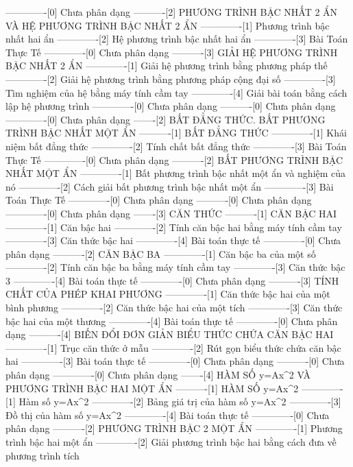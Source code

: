 -------------[0] Chưa phân dạng
----------[2] PHƯƠNG TRÌNH BẬC NHẤT 2 ẨN VÀ HỆ PHƯƠNG TRÌNH BẬC NHẤT 2 ẨN
-------------[1] Phương trình bậc nhất hai ẩn
-------------[2] Hệ phương trình bậc nhất hai ẩn
-------------[3] Bài Toán Thực Tế
-------------[0] Chưa phân dạng
----------[3] GIẢI HỆ PHƯƠNG TRÌNH BẬC NHẤT 2 ẨN
-------------[1] Giải hệ phương trình bằng phương pháp thế
-------------[2] Giải hệ phương trình bằng phương pháp cộng đại số
-------------[3] Tìm nghiệm của hệ bằng máy tính cầm tay
-------------[4] Giải bài toán bằng cách lập hệ phương trình
-------------[0] Chưa phân dạng
----------[0] Chưa phân dạng
-------------[0] Chưa phân dạng
-------[2] BẤT ĐẲNG THỨC. BẤT PHƯƠNG TRÌNH BẬC NHẤT MỘT ẨN
----------[1] BẤT ĐẲNG THỨC
-------------[1] Khái niệm bất đẳng thức
-------------[2] Tính chất bất đẳng thức
-------------[3] Bài Toán Thực Tế
-------------[0] Chưa phân dạng
----------[2] BẤT PHƯƠNG TRÌNH BẬC NHẤT MỘT ẨN
-------------[1] Bất phương trình bậc nhất một ẩn và nghiệm của nó
-------------[2] Cách giải bất phương trình bậc nhất một ẩn
-------------[3] Bài Toán Thực Tế
-------------[0] Chưa phân dạng
----------[0] Chưa phân dạng
-------------[0] Chưa phân dạng
-------[3] CĂN THỨC
----------[1] CĂN BẬC HAI
-------------[1] Căn bậc hai
-------------[2] Tính căn bậc hai bằng máy tính cầm tay
-------------[3] Căn thức bậc hai
-------------[4] Bài toán thực tế
-------------[0] Chưa phân dạng
----------[2] CĂN BẬC BA
-------------[1] Căn bậc ba của một số
-------------[2] Tính căn bậc ba bằng máy tính cầm tay
-------------[3] Căn thức bậc 3
-------------[4] Bài toán thực tế
-------------[0] Chưa phân dạng
----------[3] TÍNH CHẤT CỦA PHÉP KHAI PHƯƠNG
-------------[1] Căn thức bậc hai của một bình phương
-------------[2] Căn thức bậc hai của một tích
-------------[3] Căn thức bậc hai của một thương
-------------[4] Bài toán thực tế
-------------[0] Chưa phân dạng
----------[4] BIẾN ĐỔI ĐƠN GIẢN BIỂU THỨC CHỨA CĂN BẬC HAI
-------------[1] Trục căn thức ở mẫu
-------------[2] Rút gọn biểu thức chứa căn bậc hai
-------------[3] Bài toán thực tế
-------------[0] Chưa phân dạng
----------[0] Chưa phân dạng
-------------[0] Chưa phân dạng
-------[4] HÀM SỐ y=Ax^2 VÀ PHƯƠNG TRÌNH BẬC HAI MỘT ẨN
----------[1] HÀM SỐ y=Ax^2
-------------[1] Hàm số y=Ax^2
-------------[2] Bảng giá trị của hàm số y=Ax^2
-------------[3] Đồ thị của hàm số y=Ax^2
-------------[4] Bài toán thực tế
-------------[0] Chưa phân dạng
----------[2] PHƯƠNG TRÌNH BẬC 2 MỘT ẨN
-------------[1] Phương trình bậc hai một ẩn
-------------[2] Giải phương trình bậc hai bằng cách đưa về phương trình tích
